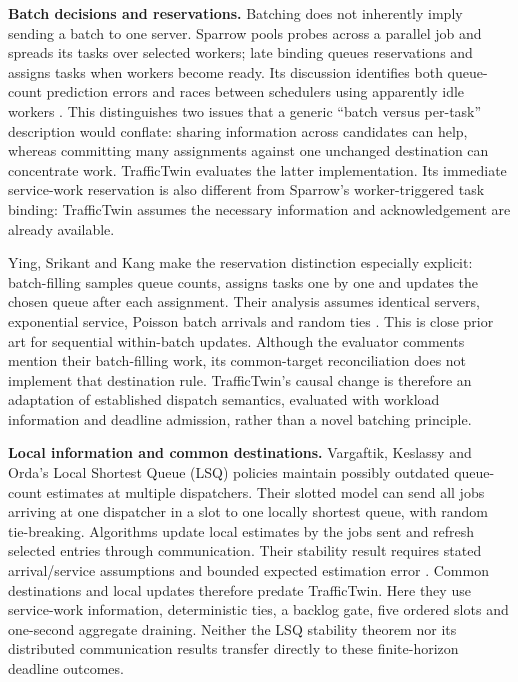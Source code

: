 \documentclass[11pt,a4paper]{article}
\begin{document}
\textbf{Batch decisions and reservations.} Batching does not inherently imply sending a batch to one server. Sparrow pools probes across a parallel job and spreads its tasks over selected workers; late binding queues reservations and assigns tasks when workers become ready. Its discussion identifies both queue-count prediction errors and races between schedulers using apparently idle workers \cite{ref9}. This distinguishes two issues that a generic ``batch versus per-task'' description would conflate: sharing information across candidates can help, whereas committing many assignments against one unchanged destination can concentrate work. TrafficTwin evaluates the latter implementation. Its immediate service-work reservation is also different from Sparrow's worker-triggered task binding: TrafficTwin assumes the necessary information and acknowledgement are already available.

Ying, Srikant and Kang make the reservation distinction especially explicit: batch-filling samples queue counts, assigns tasks one by one and updates the chosen queue after each assignment. Their analysis assumes identical servers, exponential service, Poisson batch arrivals and random ties \cite{ref13}. This is close prior art for sequential within-batch updates. Although the evaluator comments mention their batch-filling work, its common-target reconciliation does not implement that destination rule. TrafficTwin's causal change is therefore an adaptation of established dispatch semantics, evaluated with workload information and deadline admission, rather than a novel batching principle.

\textbf{Local information and common destinations.} Vargaftik, Keslassy and Orda's Local Shortest Queue (LSQ) policies maintain possibly outdated queue-count estimates at multiple dispatchers. Their slotted model can send all jobs arriving at one dispatcher in a slot to one locally shortest queue, with random tie-breaking. Algorithms update local estimates by the jobs sent and refresh selected entries through communication. Their stability result requires stated arrival/service assumptions and bounded expected estimation error \cite{ref10}. Common destinations and local updates therefore predate TrafficTwin. Here they use service-work information, deterministic ties, a backlog gate, five ordered slots and one-second aggregate draining. Neither the LSQ stability theorem nor its distributed communication results transfer directly to these finite-horizon deadline outcomes.
\end{document}

